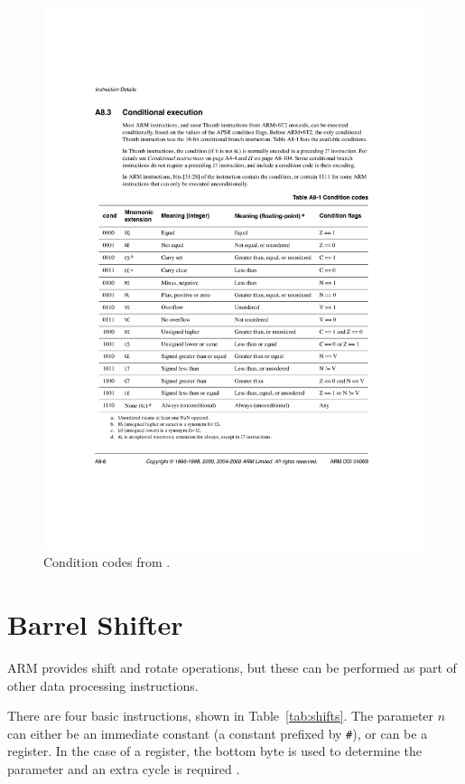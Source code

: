 \documentclass[oneside,a4paper]{report}
\begin{document}
\begin{figure}[htb]
	\centering
	\includegraphics[width=1.0\textwidth]{./fig/ConditionCodes.pdf}
	\caption{Condition codes from \cite[p. A8-8]{ARMRef}.}
	\label{fig:conditioncodes}
\end{figure}

\section{Barrel Shifter}
ARM provides shift and rotate operations, but these can be performed as part of other data processing instructions.

There are four basic instructions, shown in Table~\ref{tab:shifts}. The parameter $n$ can either be an immediate constant (a constant prefixed by \texttt{\#}), or can be a register. In the case of a register, the bottom byte is used to determine the parameter and an extra cycle is required \cite[p. 31]{ARMInst}.
\end{document}

